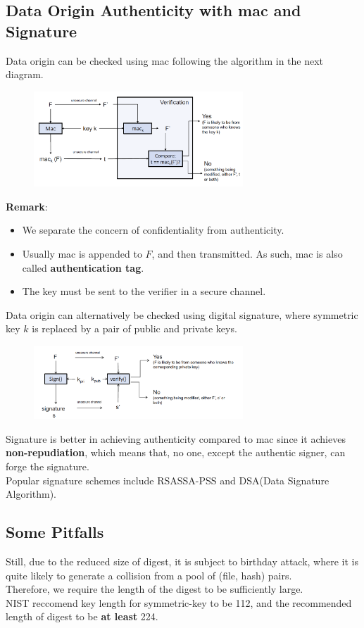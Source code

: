 \documentclass[12pt]{article}
\theoremstyle{definition}
\begin{document}
\subsection{Data Origin Authenticity with mac and Signature}
Data origin can be checked using mac following the algorithm in the next diagram.
\begin{figure}[h]
\centering
\includegraphics[width = 0.7\textwidth]{3_2.png}
\end{figure}
\textbf{Remark}: 
\begin{itemize}
\item We separate the concern of confidentiality from authenticity.
\item Usually mac is appended to $F$, and then transmitted. As such, mac is also called \textbf{authentication tag}.
\item The key must be sent to the verifier in a secure channel.
\end{itemize}
Data origin can alternatively be checked using digital signature, where symmetric key $k$ is replaced by a pair of public and private keys.
\begin{figure}[h]
\centering
\includegraphics[width = 0.7\textwidth]{3_3.png}
\end{figure}
Signature is better in achieving authenticity compared to mac since it achieves \textbf{non-repudiation}, which means that, no one, except the authentic signer, can forge the signature.\\
Popular signature schemes include RSASSA-PSS and DSA(Data Signature Algorithm).
\subsection{Some Pitfalls}
Still, due to the reduced size of digest, it is subject to birthday attack, where it is quite likely to generate a collision from a pool of (file, hash) pairs. \\
Therefore, we require the length of the digest to be sufficiently large.\\
NIST reccomend key length for symmetric-key to be 112, and the recommended length of digest to be \textbf{at least} 224. 
\clearpage
\end{document}
